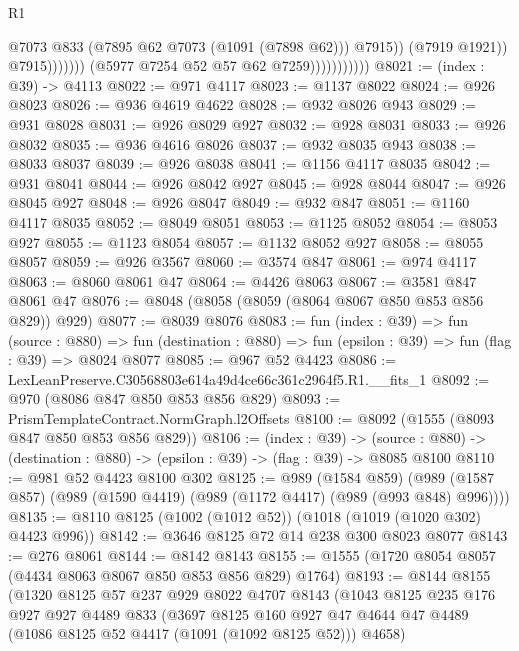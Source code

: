 \begin{lexlean}{R1}
\begin{coremodule}
                                            @7073
                                            @833
                                            (@7895 @62 @7073 (@1091 (@7898 @62)))
                                            @7915))
                                        (@7919 @1921))
                                      @7915)))))))
                        (@5977 @7254 @52 @57 @62 @7259)))))))))))
@8021 := (index : @39) -> @4113
@8022 := @971 @4117
@8023 := @1137 @8022
@8024 := @926 @8023
@8026 := @936 @4619 @4622
@8028 := @932 @8026 @943
@8029 := @931 @8028
@8031 := @926 @8029 @927
@8032 := @928 @8031
@8033 := @926 @8032
@8035 := @936 @4616 @8026
@8037 := @932 @8035 @943
@8038 := @8033 @8037
@8039 := @926 @8038
@8041 := @1156 @4117 @8035
@8042 := @931 @8041
@8044 := @926 @8042 @927
@8045 := @928 @8044
@8047 := @926 @8045 @927
@8048 := @926 @8047
@8049 := @932 @847
@8051 := @1160 @4117 @8035
@8052 := @8049 @8051
@8053 := @1125 @8052
@8054 := @8053 @927
@8055 := @1123 @8054
@8057 := @1132 @8052 @927
@8058 := @8055 @8057
@8059 := @926 @3567
@8060 := @3574 @847
@8061 := @974 @4117
@8063 := @8060 @8061 @47
@8064 := @4426 @8063
@8067 := @3581 @847 @8061 @47
@8076 := @8048 (@8058 (@8059 (@8064 @8067 @850 @853 @856 @829)) @929)
@8077 := @8039 @8076
@8083 := fun (index : @39) =>
  fun (source : @880) =>
  fun (destination : @880) => fun (epsilon : @39) => fun (flag : @39) => @8024 @8077
@8085 := @967 @52 @4423
@8086 := LexLeanPreserve.C30568803e614a49d4ce66c361c2964f5.R1.__fits_1
@8092 := @970 (@8086 @847 @850 @853 @856 @829)
@8093 := PrismTemplateContract.NormGraph.l2Offsets
@8100 := @8092 (@1555 (@8093 @847 @850 @853 @856 @829))
@8106 := (index : @39) ->
  (source : @880) -> (destination : @880) -> (epsilon : @39) -> (flag : @39) -> @8085 @8100
@8110 := @981 @52 @4423 @8100 @302
@8125 := @989
    (@1584 @859)
    (@989 (@1587 @857) (@989 (@1590 @4419) (@989 (@1172 @4417) (@989 (@993 @848) @996))))
@8135 := @8110 @8125 (@1002 (@1012 @52)) (@1018 (@1019 (@1020 @302) @4423 @996))
@8142 := @3646 @8125 @72 @14 @238 @300 @8023 @8077
@8143 := @276 @8061
@8144 := @8142 @8143
@8155 := @1555 (@1720 @8054 @8057 (@4434 @8063 @8067 @850 @853 @856 @829) @1764)
@8193 := @8144
    @8155
    (@1320
      @8125
      @57
      @237
      @929
      @8022
      @4707
      @8143
      (@1043
        @8125
        @235
        @176
        @927
        @927
        @4489
        @833
        (@3697
          @8125
          @160
          @927
          @47
          @4644
          @47
          @4489
          (@1086 @8125 @52 @4417 (@1091 (@1092 @8125 @52)))
          @4658)

\end{coremodule}
\end{lexlean}
